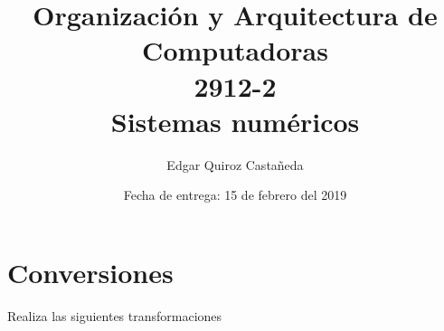\documentclass{article}
\begin{document}
    \title{Organización y Arquitectura de Computadoras \\
    \large 2912-2 \\
    \large Sistemas numéricos}

    \date{Fecha de entrega: 15 de febrero del 2019}

    \author{Edgar Quiroz Castañeda}  

    \maketitle
    
    \section{Conversiones}
    Realiza las siguientes transformaciones
\end{document}

